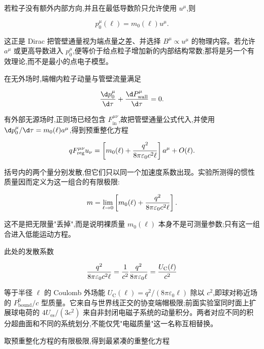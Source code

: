 若粒子没有额外内部方向,并且在最低导数阶只允许使用 $u^\mu$,则

\begin{equation*}
 p_0^\mu(\ell)=m_0(\ell)u^\mu.
\end{equation*}

这正是 Dirac 把管壁通量视为端点量之差、并选择 $B^\mu\propto u^\mu$ 的物理内容。若允许 $a^\mu$ 或更高导数进入 $p_0^\mu$,便等价于给点粒子增加新的内部结构常数;那将是另一个有效理论,而不是最小的点电子模型。

在无外场时,端帽内粒子动量与管壁流量满足

\begin{equation*}
 {\d p_0^\mu\over\d\tau}
 +{\d P_{\mathrm{wall}}^\mu\over\d\tau}=0.
\end{equation*}

有外部无源场时,正则场已经包含 $F_{\mathrm{in}}^{\mu\nu}$,故把管壁通量公式代入,并使用 ${\d p_0^\mu/\d\tau}=m_0(\ell)a^\mu$,得到预重整化方程

\begin{equation*}
 qF_{\mathrm{reg}}^{\mu\nu}u_\nu
 =\left[
 m_0(\ell)
 +{q^2\over8\pi\varepsilon_0c^2\ell}
 \right]a^\mu+O(\ell).
\end{equation*}

括号内的两个量分别发散,但它们只以同一个加速度系数出现。实验所测得的惯性质量因而定义为这一组合的有限极限:

\begin{equation*}
 m
 =\lim_{\ell\to0}
 \left[
 m_0(\ell)
 +{q^2\over8\pi\varepsilon_0c^2\ell}
 \right].
\end{equation*}

这不是把无限量"丢掉",而是说明裸质量 $m_0(\ell)$ 本身不是可测量参数;只有这一组合进入低能运动方程。

此处的发散系数

\begin{equation*}
 {q^2\over8\pi\varepsilon_0c^2\ell}
 ={1\over c^2}{q^2\over8\pi\varepsilon_0\ell}
 ={U_{\mathrm C}(\ell)\over c^2}
\end{equation*}

等于半径 $\ell$ 的 Coulomb 外场能 $U_{\mathrm C}(\ell)=q^2/(8\pi\varepsilon_0\ell)$ 除以 $c^2$,即球对称近场的 $P_{\mathrm{bound}}^0/c$ 型质量。它来自与世界线正交的协变端帽极限;前面实验室同时面上扩展球电荷的 $4U_{\mathrm{es}}/(3c^2)$ 来自非封闭电磁子系统的动量积分。两者对应不同的积分超曲面和不同的系统划分,不能仅凭"电磁质量"这一名称互相替换。

取预重整化方程的有限极限,得到最紧凑的重整化方程

